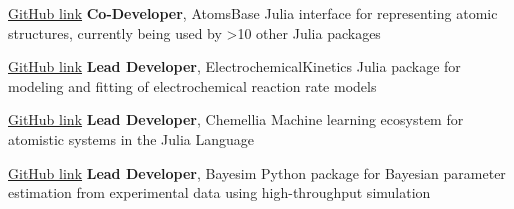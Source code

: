     {\href{https://github.com/https://github.com/JuliaMolSim/AtomsBase.jl}{GitHub link}}
    {\textbf{Co-Developer}, AtomsBase}
    {Julia interface for representing atomic structures, currently being used by >10 other Julia packages}

\vspace{-3mm}
    {\href{https://github.com/BattModels/ElectrochemicalKinetics.jl}{GitHub link}}
    {\textbf{Lead Developer}, ElectrochemicalKinetics}
    {Julia package for modeling and fitting of electrochemical reaction rate models}

\vspace{-3mm}
    {\href{https://github.com/Chemellia}{GitHub link}}
    {\textbf{Lead Developer}, Chemellia}
    {Machine learning ecosystem for atomistic systems in the Julia Language}

\vspace{-3mm}
    {\href{https://github.com/PV-Lab/bayesim}{GitHub link}}
    {\textbf{Lead Developer}, Bayesim}
    {Python package for Bayesian parameter estimation from experimental data using high-throughput simulation}
